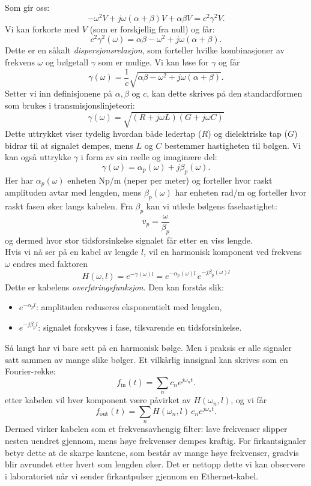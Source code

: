 Som gir oss:
\[    
-\omega^2 V + j\omega(\alpha+\beta)V + \alpha \beta V = c^2 \gamma^2 V.
\]
Vi kan forkorte med $V$ (som er forskjellig fra null) og får:
\[
c^2 \gamma^2(\omega) = \alpha \beta - \omega^2 + j\omega(\alpha+\beta).
\]
\clearpage
\noindent Dette er en såkalt \emph{dispersjonsrelasjon}, som forteller hvilke kombinasjoner av 
frekvens $\omega$ og bølgetall $\gamma$ som er mulige. Vi kan løse for $\gamma$ og får
\[
\gamma(\omega) = \frac{1}{c}\sqrt{\alpha\beta - \omega^2 + j\omega(\alpha+\beta)}.
\]
Setter vi inn definisjonene på $\alpha,\beta$ og $c$, kan dette skrives på den standardformen
som brukes i transmisjonslinjeteori:
\begin{equation}
\;\gamma(\omega) = \sqrt{(R+j\omega L)(G+j\omega C)}\;
\label{eq:prop-konstant}
\end{equation}
Dette uttrykket viser tydelig hvordan både ledertap ($R$) og dielektriske tap ($G$) bidrar 
til at signalet dempes, mens $L$ og $C$ bestemmer hastigheten til bølgen. Vi kan også uttrykke $\gamma$
i form av sin reelle og imaginære del:
\[
\gamma(\omega) = \alpha_p(\omega) + j\beta_p(\omega).
\]
Her har $\alpha_p(\omega)$ enheten Np/m (neper per meter) og forteller hvor raskt amplituden 
avtar med lengden, mens $\beta_p(\omega)$ har enheten rad/m og forteller hvor raskt fasen 
øker langs kabelen. Fra $\beta_p$ kan vi utlede bølgens fasehastighet:
\[v_p = \frac{\omega}{\beta_p}\]
og dermed hvor stor tidsforsinkelse signalet får etter en viss lengde.\\[1em]
Hvis vi nå ser på en kabel av lengde $l$, vil en harmonisk komponent ved frekvens $\omega$ 
endres med faktoren
\begin{equation}
H(\omega,l) = e^{-\gamma(\omega)l} = e^{-\alpha_p(\omega)l}\,e^{-j\beta_p(\omega)l}
\end{equation}
Dette er kabelens \emph{overføringsfunksjon}. 
Den kan forstås slik:
\begin{itemize}
    \item \textbf{$e^{-\alpha_p l}$}: amplituden reduseres eksponentielt med lengden, 
    \item \textbf{$e^{-j\beta_p l}$}: signalet forskyves i fase, tilsvarende en tidsforsinkelse.\\[1em]
\end{itemize}
Så langt har vi bare sett på en harmonisk bølge. Men i praksis er alle signaler satt sammen av mange slike bølger. 
Et vilkårlig innsignal kan skrives som en Fourier-rekke:
\[
f_{\text{in}}(t) = \sum_n c_n e^{j\omega_n t}.
\]
etter kabelen vil hver komponent være påvirket av $H(\omega_n,l)$, og vi får
\[
f_{\text{out}}(t) = \sum_n H(\omega_n,l)\,c_n e^{j\omega_n t}.
\]
Dermed virker kabelen som et frekvensavhengig filter: lave frekvenser slipper nesten uendret gjennom, 
mens høye frekvenser dempes kraftig. For firkantsignaler betyr dette at de skarpe kantene, 
som består av mange høye frekvenser, gradvis blir avrundet etter hvert som lengden øker. 
Det er nettopp dette vi kan observere i laboratoriet når vi sender firkantpulser gjennom en Ethernet-kabel.



